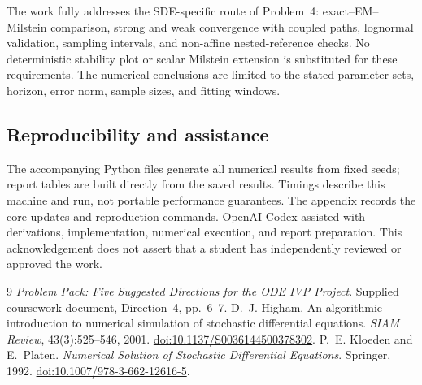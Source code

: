 \documentclass[11pt,a4paper]{article}
\begin{document}
The work fully addresses the SDE-specific route of Problem~4: exact--EM--Milstein comparison, strong and weak convergence with coupled paths, lognormal validation, sampling intervals, and non-affine nested-reference checks. No deterministic stability plot or scalar Milstein extension is substituted for these requirements. The numerical conclusions are limited to the stated parameter sets, horizon, error norm, sample sizes, and fitting windows.

\subsection*{Reproducibility and assistance}
The accompanying Python files generate all numerical results from fixed seeds; report tables are built directly from the saved results. Timings describe this machine and run, not portable performance guarantees. The appendix records the core updates and reproduction commands. OpenAI Codex assisted with derivations, implementation, numerical execution, and report preparation. This acknowledgement does not assert that a student has independently reviewed or approved the work.

\begin{thebibliography}{9}
 \emph{Problem Pack: Five Suggested Directions for the ODE IVP Project}.
Supplied coursework document, Direction~4, pp.~6--7.
 D.~J. Higham. An algorithmic introduction to numerical simulation of stochastic differential equations. \emph{SIAM Review}, 43(3):525--546, 2001.
\href{https://doi.org/10.1137/S0036144500378302}{doi:10.1137/S0036144500378302}.
 P.~E. Kloeden and E.~Platen. \emph{Numerical Solution of Stochastic Differential Equations}. Springer, 1992.
\href{https://doi.org/10.1007/978-3-662-12616-5}{doi:10.1007/978-3-662-12616-5}.
\end{thebibliography}

\newpage
\appendix
\end{document}

